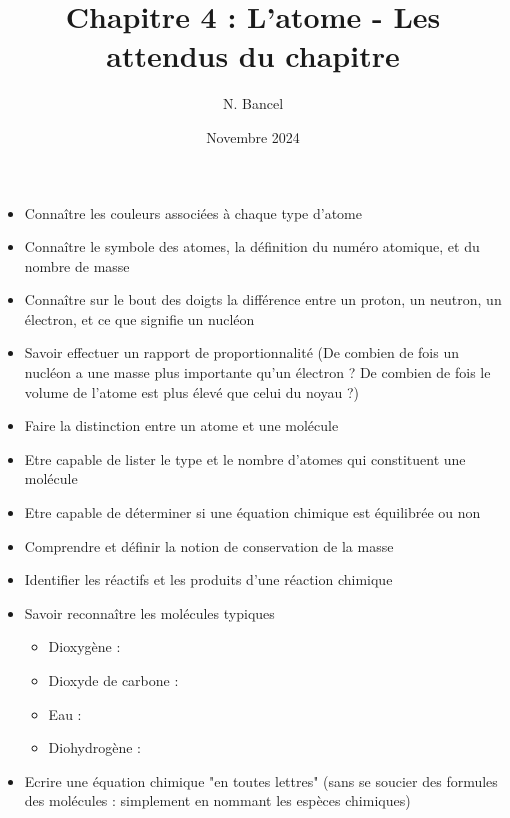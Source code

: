 \documentclass[a4paper,12pt]{article}
\begin{document}
\title{Chapitre 4 : L'atome - Les attendus du chapitre}
\author{N. Bancel}
\date{Novembre 2024}
\maketitle


\begin{tcolorbox}[colback=blue!10!white, colframe=blue!75!black, title=A savoir]
  \begin{itemize}[noitemsep]
    \item Connaître les couleurs associées à chaque type d'atome 
    \item Connaître le symbole des atomes, la définition du numéro atomique, et du nombre de masse 
    \item Connaître sur le bout des doigts la différence entre un proton, un neutron, un électron, et ce que signifie un nucléon
    \item Savoir effectuer un rapport de proportionnalité (De combien de fois un nucléon a une masse plus importante qu'un électron ? De combien de fois le volume de l'atome est plus élevé que celui du noyau ?)
    \item Faire la distinction entre un atome et une molécule 
    \item Etre capable de lister le type et le nombre d'atomes qui constituent une molécule 
    \item Etre capable de déterminer si une équation chimique est équilibrée ou non
    \item Comprendre et définir la notion de conservation de la masse 
    \item Identifier les réactifs et les produits d'une réaction chimique
    \item Savoir reconnaître les molécules typiques 
    \begin{itemize}
      \item Dioxygène : 
      \item Dioxyde de carbone : 
      \item Eau : 
      \item Diohydrogène : 
    \end{itemize}
    \item Ecrire une équation chimique "en toutes lettres" (sans se soucier des formules des molécules : simplement en nommant les espèces chimiques)
  \end{itemize}
\end{tcolorbox}
\end{document}
